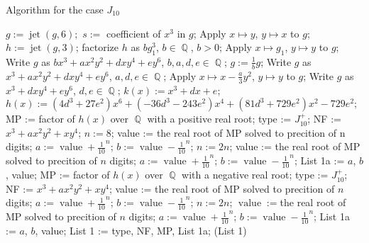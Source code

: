 \documentclass[noend]{amsproc}
\theoremstyle{definition}
\DeclareMathOperator{\val}{value}
\DeclareMathOperator{\m}{\mathfrak{m}}
\DeclareMathOperator{\jet}{jet}
\DeclareMathOperator{\Q}{\mathbb{Q}}
\begin{document}
\begin{algorithm}[ht]
\caption{Algorithm for the case $J_{10}$}%
\label{alg:J_{10}}
\begin{algorithmic}[1]

\Require{$g \in \m^3\subset\Q[x,y]$ of complex singularity type $J_{10}$.}

 
\State $g:=\jet(g,6);$
\State $s := $ coefficient of $x^3$ in $g$;
\State Apply $x\mapsto y$, $y\mapsto x$ to $g$;
\EndIf
\State $h:=\jet(g,3)$;
\State factorize $h$ as $bg_1^3$, $b\in\Q$, $b>0$;
\State Apply $x\mapsto g_1$, $y\mapsto y$ to $g$;
\State Write $g$ as $bx^3+ax^2y^2+dxy^4+ey^6$, $b,a,d,e\in\Q$;
\State $g:= \frac{1}{b}g$;
\State Write $g$ as $x^3+ax^2y^2+dxy^4+ey^6$, $a,d,e\in\Q$;
\State Apply $x\mapsto x-\frac{a}{3}y^2$, $y\mapsto y$ to $g$;
\State Write $g$ as $x^3+dxy^4+ey^6$, $d,e\in\Q$;
\State $k(x):= x^3+dx+e$;
\State $h(x):=(4d^3+27e^2)x^6+(-36d^3-243e^2)x^4+(81d^3+729e^2)x^2-729e^2;$
\State MP := factor of $h(x)$ over $\Q$ with a positive real root;
\State type := $J_{10}^+$;
\State NF := $x^3+ax^2y^2+xy^4$;
\State $n := 8$;
\State value := the real root of MP solved to precition of n digits;
\State $a:=\val+\frac{1}{10}^n$;
\State $b:=\val-\frac{1}{10}^n$;
\State $n:=2n$;
\State value := the real root of MP solved to precition of $n$ digits;
\State $a:=\val+\frac{1}{10}^n$;
\State $b:=\val-\frac{1}{10}^n$;
\EndWhile
\State List 1a := $a$,  $b$, value;
\Else
\State MP := factor of $h(x)$ over $\Q$ with a negative real root;
\State type := $J_{10}^+$;
\State NF := $x^3+ax^2y^2+xy^4$;
\State value := the real root of MP solved to precition of $n$ digits;
\State $a:=\val+\frac{1}{10}^n$;
\State $b:=\val-\frac{1}{10}^n$;
\State $n:=2n$;
\State $\val := $the real root of MP solved to precition of $n$ digits;
\State $a:=\val+\frac{1}{10}^n$;
\State $b:=\val-\frac{1}{10}^n$;
\EndWhile
\State List 1a := $a$, $b$, value;
\EndIf
\State List 1 := type, NF, MP, List 1a;
\Return (List 1)
\end{algorithmic}
\end{algorithm}
\end{document}
